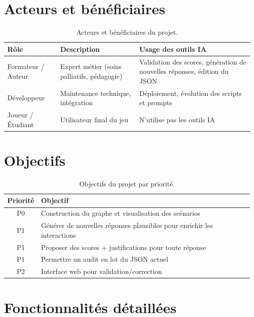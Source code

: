 \section{Acteurs et b\'en\'eficiaires}

\begin{table}[!htbp]
\centering
\small
\begin{tabular}{l p{4.5cm} p{6cm}}
\toprule
\textbf{R\^ole} & \textbf{Description} & \textbf{Usage des outils IA} \\
\midrule
Formateur / Auteur & Expert m\'etier (soins palliatifs, p\'edagogie) & Validation des scores, g\'en\'eration de nouvelles r\'eponses, \'edition du JSON \\
D\'eveloppeur & Maintenance technique, int\'egration & D\'eploiement, \'evolution des scripts et prompts \\
Joueur / \'Etudiant & Utilisateur final du jeu & N'utilise pas les outils IA \\
\bottomrule
\end{tabular}
\caption{Acteurs et b\'en\'eficiaires du projet.}
\end{table}

\section{Objectifs}

\begin{table}[!htbp]
\centering
\begin{tabular}{c p{12cm}}
\toprule
\textbf{Priorit\'e} & \textbf{Objectif} \\
\midrule
P0 & Construction du graphe et visualisation des sc\'enarios \\
P1 & G\'en\'erer de nouvelles r\'eponses plausibles pour enrichir les interactions \\
P1 & Proposer des scores + justifications pour toute r\'eponse \\
P1 & Permettre un audit en lot du JSON actuel \\
P2 & Interface web pour validation/correction \\
\bottomrule
\end{tabular}
\caption{Objectifs du projet par priorit\'e.}
\end{table}

\section{Fonctionnalit\'es d\'etaill\'ees}

